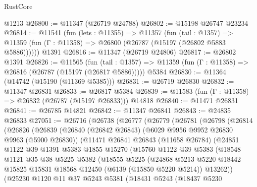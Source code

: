 \begin{lexlean}{RustCore}
\begin{coremodule}
    @1213
@26800 := @11347 (@26719 @24788)
@26802 := @15198 @26747 @23234
@26814 := @11541
    (fun (lets : @11355) =>
    @11357
      (fun (tail : @1357) =>
      @11359 (fun (Γ : @11358) => @26800 (@26787 (@15197 (@26802 @5883 @5886))))))
    @1391
@26816 := @11347 (@26719 @24806)
@26817 := @26802 @1391
@26826 := @11565
    (fun (tail : @1357) => @11359 (fun (Γ : @11358) => @26816 (@26787 (@15197 (@26817 @5886)))))
    @5384
@26830 := @11364 (@14742 (@15190 (@11369 @5385)))
@26831 := @26719 @26830
@26832 := @11347 @26831
@26833 := @26817 @5384
@26839 := @11583 (fun (Γ : @11358) => @26832 (@26787 (@15197 @26833))) @14818
@26840 := @11471 @26831
@26841 := @26785 @14821
@26842 := @11347 @26841
@26843 := @24835 @26833
@27051 := @26716
    (@26738
      (@26777
        (@26779
          (@26781
            (@26798
              (@26814
                (@26826
                  (@26839
                    (@26840
                      (@26842 @26843)
                      (@6029 @9956 @9952 @26830 @9963 (@5900 @26830))
                      (@11471
                        @26841
                        @26843
                        (@11658 @26784)
                        (@24851
                          @1122
                          @39
                          @1391
                          @5383
                          @1855
                          @15270
                          (@15760
                            @1122
                            @39
                            @5383
                            (@18548
                              @1121
                              @35
                              @38
                              @5225
                              @5382
                              (@18555
                                @5225
                                (@24868
                                  @5213
                                  @5220
                                  @18442
                                  @15825
                                  @15831
                                  @18568
                                  @12450
                                  (@6139 (@15850 @5220 @5214))
                                  @13262))
                              (@25230
                                @1120
                                @11
                                @37
                                @5243
                                @5381
                                (@18431
                                  @5243
                                  (@18437
                                    @5230

\end{coremodule}
\end{lexlean}

